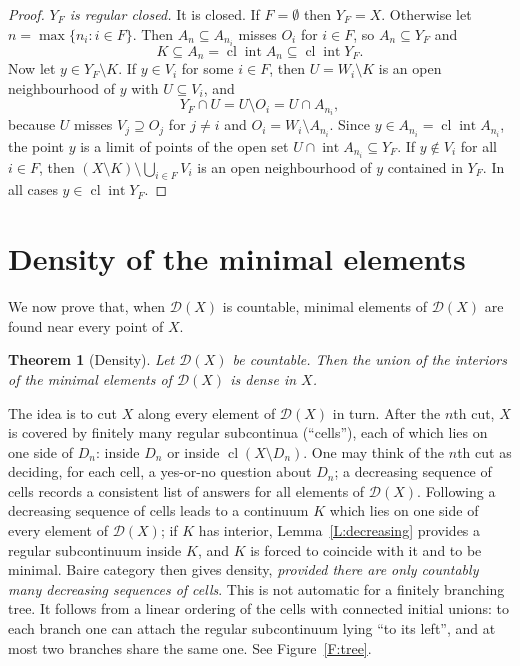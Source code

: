 \documentclass[11pt,reqno]{amsart}
\theoremstyle{plain}
\newtheorem{theorem}{Theorem}[section]
\theoremstyle{definition}
\theoremstyle{remark}
\newcommand{\D}{\mathcal{D}}
\newcommand{\cl}{\operatorname{cl}}
\newcommand{\intr}{\operatorname{int}}
\begin{document}
\begin{proof}
\emph{$Y_F$ is regular closed.} It is closed. If $F=\emptyset$ then $Y_F=X$. Otherwise let $n=\max\{n_i:i\in F\}$. Then $A_n\subseteq A_{n_i}$ misses $O_i$ for $i\in F$, so $A_n\subseteq Y_F$ and
\[
K\subseteq A_n=\cl\intr A_n\subseteq\cl\intr Y_F .
\]
Now let $y\in Y_F\setminus K$. If $y\in V_i$ for some $i\in F$, then $U=W_i\setminus K$ is an open neighbourhood of $y$ with $U\subseteq V_i$, and
\[
Y_F\cap U=U\setminus O_i=U\cap A_{n_i},
\]
because $U$ misses $V_j\supseteq O_j$ for $j\neq i$ and $O_i=W_i\setminus A_{n_i}$. Since $y\in A_{n_i}=\cl\intr A_{n_i}$, the point $y$ is a limit of points of the open set $U\cap\intr A_{n_i}\subseteq Y_F$. If $y\notin V_i$ for all $i\in F$, then $(X\setminus K)\setminus\bigcup_{i\in F}V_i$ is an open neighbourhood of $y$ contained in $Y_F$. In all cases $y\in\cl\intr Y_F$.
\end{proof}

\section{Density of the minimal elements}\label{S:density}

We now prove that, when $\D(X)$ is countable, minimal elements of $\D(X)$ are found near every point of $X$.

\begin{theorem}[Density]\label{T:density}
Let $\D(X)$ be countable. Then the union of the interiors of the minimal elements of $\D(X)$ is dense in $X$.
\end{theorem}

The idea is to cut $X$ along every element of $\D(X)$ in turn. After the $n$th cut, $X$ is covered by finitely many regular subcontinua (``cells''), each of which lies on one side of $D_n$: inside $D_n$ or inside $\cl(X\setminus D_n)$. One may think of the $n$th cut as deciding, for each cell, a yes-or-no question about $D_n$; a decreasing sequence of cells records a consistent list of answers for all elements of $\D(X)$. Following a decreasing sequence of cells leads to a continuum $K$ which lies on one side of every element of $\D(X)$; if $K$ has interior, Lemma~\ref{L:decreasing} provides a regular subcontinuum inside $K$, and $K$ is forced to coincide with it and to be minimal. Baire category then gives density, \emph{provided there are only countably many decreasing sequences of cells}. This is not automatic for a finitely branching tree. It follows from a linear ordering of the cells with connected initial unions: to each branch one can attach the regular subcontinuum lying ``to its left'', and at most two branches share the same one. See Figure~\ref{F:tree}.
\end{document}
